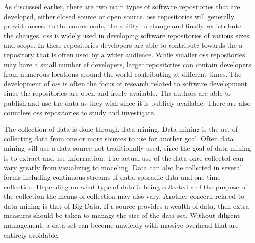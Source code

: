 
As discussed earlier, there are two main types of software repositories that are developed, either closed source or open source. \gls{oss} repositories will generally provide access to the source code, the ability to change and finally redistribute the changes. \gls{oss} is widely used in developing software repositories of various sizes and scope. In these repositories developers are able to contribute towards the a repository that is often used by a wider audience. While smaller \gls{oss} repositories may have a small number of developers, larger repositories can contain developers from numerous locations around the world contributing at different times. The development of \gls{oss} is often the focus of research related to software development since the repositories are open and freely available. The authors are able to publish and use the data as they wish since it is publicly available. There are also countless \gls{oss} repositories to study and investigate.

The collection of data is done through data mining. Data mining is the act of collecting data from one or more sources to use for another goal. Often data mining will use a data source not traditionally used, since the goal of data mining is to extract and use information. The actual use of the data once collected can vary greatly from visualizing to modeling. Data can also be collected in several forms including continuous streams of data, sporadic data and one time collection. Depending on what type of data is being collected and the purpose of the collection the means of collection may also vary. Another concern related to data mining is that of Big Data. If a source provides a wealth of data, then extra measures should be taken to manage the size of the data set. Without diligent management, a data set can become unwieldy with massive overhead that are entirely avoidable.

